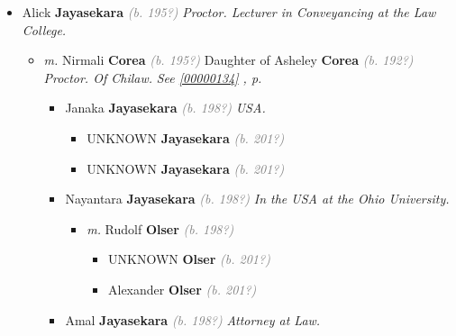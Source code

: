 \documentclass[10pt, openany]{book}
\begin{document}
\begin{itemize}
{\begin{itemize}
{\begin{itemize}
{\begin{itemize}
{\begin{itemize}
{\begin{itemize}
\item{Shirani \textbf{Jayasekara} \textcolor{gray}{\textit{(b. 199?)}}
 }
\end{itemize}}
\end{itemize}
 }
\item{Alick \textbf{Jayasekara} \textcolor{gray}{\textit{(b. 195?)}} \textcolor{slmaroon}{\textit{Proctor.
Lecturer in Conveyancing at the Law College.}}
\begin{itemize}
\item{\textit{m.} Nirmali \textbf{Corea} \textcolor{gray}{\textit{(b. 195?)}} Daughter of  Asheley \textbf{Corea} \textcolor{gray}{\textit{(b. 192?)}} \textcolor{slmaroon}{\textit{Proctor.
Of Chilaw.}} \textcolor{slteal}{\textit{See  \autoref{00000134} \textit{, p. \pageref{00000134} }}}   \label{couple:00000135:00000273} \begin{itemize}
\item{Janaka \textbf{Jayasekara} \textcolor{gray}{\textit{(b. 198?)}} \textcolor{slmaroon}{\textit{USA.}}
\begin{itemize}
\item{UNKNOWN \textbf{Jayasekara} \textcolor{gray}{\textit{(b. 201?)}}
 }
\item{UNKNOWN \textbf{Jayasekara} \textcolor{gray}{\textit{(b. 201?)}}
 }
\end{itemize}
 }
\item{Nayantara \textbf{Jayasekara} \textcolor{gray}{\textit{(b. 198?)}} \textcolor{slmaroon}{\textit{In the USA at the Ohio University.}}
\begin{itemize}
\item{\textit{m.} Rudolf \textbf{Olser} \textcolor{gray}{\textit{(b. 198?)}}   \label{couple:00000308:00000576} \begin{itemize}
\item{UNKNOWN \textbf{Olser} \textcolor{gray}{\textit{(b. 201?)}}
 }
\item{Alexander \textbf{Olser} \textcolor{gray}{\textit{(b. 201?)}}
 }
\end{itemize}}
\end{itemize}
 }
\item{Amal \textbf{Jayasekara} \textcolor{gray}{\textit{(b. 198?)}} \textcolor{slmaroon}{\textit{Attorney at Law.}}
\begin{itemize}

\end{itemize}}
\end{itemize}}
\end{itemize}}
\end{itemize}}
\end{itemize}}
\end{itemize}}
\end{itemize}
\end{document}
